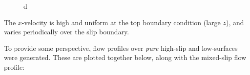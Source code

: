 \documentclass[12pt, a4paper, twoside, openright]{book}
\begin{document}
\begin{figure}[ht]
\centering
{}
\caption{d}\label{d}
\end{figure}


The $x$-velocity is high and uniform at the top boundary condition (large $z$), and varies periodically over the slip boundary.

\vspace{1em}
To provide some perspective, flow profiles over \emph{pure} high-slip and low-surfaces were generated.  These are plotted together below, along with the mixed-slip flow profile:
\end{document}

